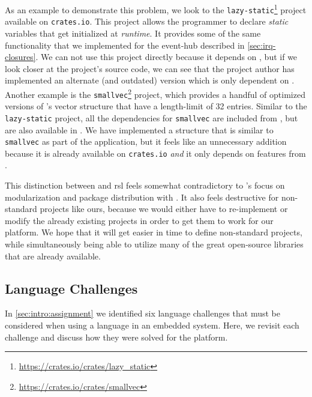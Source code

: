 As an example to demonstrate this problem, we look to the \texttt{lazy-static}\footnote{\url{https://crates.io/crates/lazy_static}} project available on \texttt{crates.io}.
This project allows the programmer to declare \emph{static} variables that get initialized at \emph{runtime}.
It provides some of the same functionality that we implemented for the event-hub described in \autoref{sec:irq-closures}.
We can not use this project directly because it depends on {\std}, but if we look closer at the project's source code, we can see that the project author has implemented an alternate (and outdated) version which is only dependent on {\core}.
Another example is the \texttt{smallvec}\footnote{\url{https://crates.io/crates/smallvec}} project, which provides a handful of optimized versions of {\rust}'s vector structure that have a length-limit of 32 entries.
Similar to the \texttt{lazy-static} project, all the dependencies for \texttt{smallvec} are included from {\std}, but are also available in {\core}.
We have implemented a structure that is similar to \texttt{smallvec} as part of the {\tracker} application, but it feels like an unnecessary addition because it is already available on \texttt{crates.io} \emph{and} it only depends on features from {\core}.

This distinction between {\std} and \gls{rsl} feels somewhat contradictory to {\rust}'s focus on modularization and package distribution with {\cargo}.
It also feels destructive for non-standard projects like ours, because we would either have to re-implement or modify the already existing projects in order to get them to work for our platform.
We hope that it will get easier in time to define non-standard projects, while simultaneously being able to utilize many of the great open-source libraries that are already available.

\subsection{Language Challenges}
\label{sec:disc:lang-challenges}

In \autoref{sec:intro:assignment} we identified six language challenges that must be considered when using a language in an embedded system.
Here, we revisit each challenge and discuss how they were solved for the {\rg} platform.

